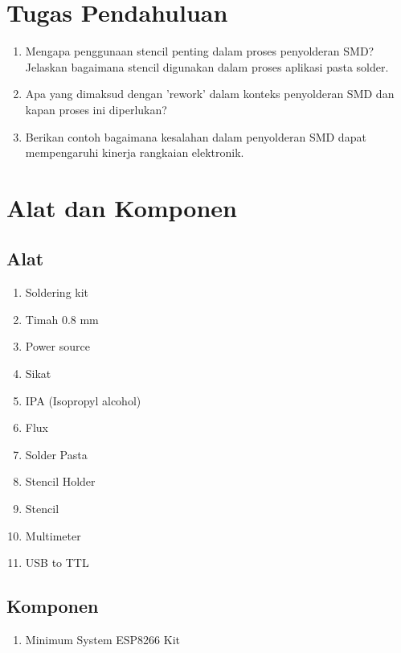 \section{Tugas Pendahuluan}
\begin{enumerate}
    \item Mengapa penggunaan stencil penting dalam proses penyolderan SMD? Jelaskan bagaimana stencil digunakan dalam proses aplikasi pasta solder.
    \item Apa yang dimaksud dengan 'rework' dalam konteks penyolderan SMD dan kapan proses ini diperlukan?
    \item Berikan contoh bagaimana kesalahan dalam penyolderan SMD dapat mempengaruhi kinerja rangkaian elektronik.
\end{enumerate}

\section{Alat dan Komponen}
\subsection{Alat}
\begin{enumerate}
    \item Soldering kit
    \item Timah 0.8 mm
    \item Power source
    \item Sikat 
    \item IPA (Isopropyl alcohol)
    \item Flux
    \item Solder Pasta
    \item Stencil Holder
    \item Stencil
    \item Multimeter
    \item USB to TTL
\end{enumerate}

\subsection{Komponen}
\begin{enumerate}
    \item Minimum System ESP8266 Kit
\end{enumerate}

